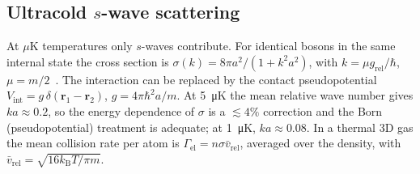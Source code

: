 \documentclass[11pt,a4paper]{article}
\newcommand{\kB}{k_\mathrm{B}}
\begin{document}
\subsection{Ultracold $s$-wave scattering}
At $\mu$K temperatures only $s$-waves contribute. For identical bosons in the same internal state the cross section is $\sigma(k)=8\pi a^2/(1+k^2a^2)$, with $k=\mu g_\mathrm{rel}/\hbar$, $\mu=m/2$~\cite{Bloch2008}. The interaction can be replaced by the contact pseudopotential $V_\mathrm{int}=g\,\delta(\bm r_1-\bm r_2)$, $g=4\pi\hbar^2a/m$. At \SI{5}{\micro K} the mean relative wave number gives $ka\approx0.2$, so the energy dependence of $\sigma$ is a $\lesssim4\%$ correction and the Born (pseudopotential) treatment is adequate; at \SI{1}{\micro K}, $ka\approx0.08$. In a thermal 3D gas the mean collision rate per atom is $\Gamma_\mathrm{el}=n\sigma\bar v_\mathrm{rel}$, averaged over the density, with $\bar v_\mathrm{rel}=\sqrt{16\kB T/\pi m}$.
\end{document}
